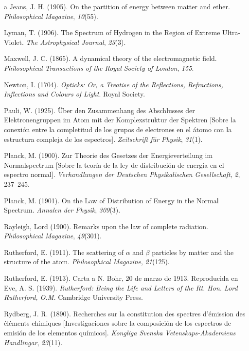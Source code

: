 \documentclass[11pt,a4paper,spanish]{book}
\begin{document}
\begin{thebibliography}{a}
   Jeans, J. H. (1905). On the
  partition of energy between matter and ether. \emph{Philosophical
  Magazine}, \emph{10}(55).

   Lyman, T. (1906). The Spectrum of
  Hydrogen in the Region of Extreme Ultra-Violet. \emph{The
  Astrophysical Journal}, \emph{23}(3).

   Maxwell, J. C. (1865). A
  dynamical theory of the electromagnetic field. \emph{Philosophical
  Transactions of the Royal Society of London}, \emph{155}.

   Newton, I. (1704).
  \emph{Opticks: Or, a Treatise of the Reflections, Refractions,
  Inflections and Colours of Light}. Royal Society.

   Pauli, W. (1925). Über den
  Zusammenhang des Abschlusses der Elektronengruppen im Atom mit der
  Komplexstruktur der Spektren [Sobre la conexión entre la
    completitud de los grupos de electrones en el átomo con la
  estructura compleja de los espectros]. \emph{Zeitschrift für
  Physik}, \emph{31}(1).

   Planck, M. (1900). Zur Theorie
  des Gesetzes der Energieverteilung im Normalspectrum [Sobre la
  teoría de la ley de distribución de energía en el espectro normal].
  \emph{Verhandlungen der Deutschen Physikalischen Gesellschaft},
  \emph{2}, 237--245.

   Planck, M. (1901). On the Law
  of Distribution of Energy in the Normal Spectrum. \emph{Annalen der
  Physik}, \emph{309}(3).

   Rayleigh, Lord (1900).
  Remarks upon the law of complete radiation. \emph{Philosophical
  Magazine}, \emph{49}(301).

   Rutherford, E. (1911).
  The scattering of \(\alpha\) and \(\beta\) particles by matter and
  the structure of the atom. \emph{Philosophical Magazine},
  \emph{21}(125).

   Rutherford, E.
  (1913). Carta a N. Bohr, 20 de marzo de 1913. Reproducida en Eve,
  A. S. (1939). \emph{Rutherford: Being the Life and Letters of the
  Rt. Hon. Lord Rutherford, O.M.} Cambridge University Press.

   Rydberg, J. R. (1890).
  Recherches sur la constitution des spectres d'émission des éléments
  chimiques [Investigaciones sobre la composición de los espectros de
  emisión de los elementos químicos]. \emph{Kongliga Svenska
  Vetenskaps-Akademiens Handlingar}, \emph{23}(11).


\end{thebibliography}
\end{document}
